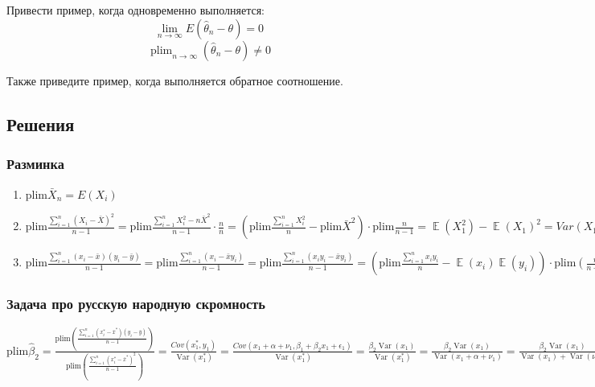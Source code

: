 \documentclass[10pt, a4paper]{extarticle}
\DeclareMathOperator{\E}{\mathbb{E}}
\DeclareMathOperator{\plim}{plim}
\DeclareMathOperator{\Var}{Var}
\begin{document}
\subsection{}

Привести пример, когда одновременно выполняется:
\[
\lim_{n \to \infty}
E(\hat \theta_{n} - \theta) = 0
\]
\[
\plim_{n \to \infty}
(\hat \theta_{n} - \theta) \neq 0
\]

Также приведите пример, когда выполняется обратное соотношение.


\subsection{Решения}

\subsubsection*{Разминка}

\begin{enumerate}
	\item $\text{plim} \bar{X}_n = E(X_i)$
	
	\item $\text{plim} \frac{\sum_{i = 1}^{n}(X_i - \bar{X})^2}{n - 1} = \text{plim} \frac{\sum_{i = 1}^nX_i^2 - n \bar{X}^2}{n - 1} \cdot \frac{n}{n} = \left( \text{plim} \frac{\sum_{i = 1}^n X_i^2 }{n} - \text{plim} \bar{X}^2 \right) \cdot \text{plim}  \frac{n}{n-1} = \E(X_1^2) - \E(X_1)^2 = Var(X_1)$
	
	\item $ \text{plim} \frac{\sum_{i = 1}^n(x_i - \bar{x})(y_i - \bar{y})}{n - 1} = \text{plim}\frac{\sum_{i = 1}^n(x_i - \bar{x}y_i)}{n - 1} = \text{plim} \frac{\sum_{i = 1}^n(x_iy_i - \bar{x}y_i)}{n - 1} = \left( \text{plim} \frac{\sum_{i = 1}^nx_iy_i}{n} - \E(x_i)\E(y_i) \right) \cdot \text{plim} \left( \frac{n}{n-1} \right) = \E(XY) - \E(X)\E(Y) = (X, Y)$
	
	
\end{enumerate}
\subsubsection*{Задача про русскую народную скромность}
$\text{plim} \hat{\beta}_2 = \frac{\text{plim} \left( \frac{\sum_{i = 1}^n(x_i^* - \bar{x}^*)(y_i - \bar{y})}{n-1} \right)}{\text{plim} \left( \frac{\sum_{i = 1}^n(x_i^* - \bar{x}^*)^2}{n-1}\right)} = \frac{Cov(x_1^*, y_1)}{\Var(x_1^*)} = \frac{{Cov}(x_1 + \alpha + \nu_1, \beta_1 + \beta_2x_1 + \epsilon_1)}{\Var(x_1^*)} = \frac{\beta_2\Var(x_1)}{\Var(x_1^*)} = \frac{\beta_2\Var(x_1)}{\Var(x_1 + \alpha + \nu_1)} = \frac{\beta_2\Var(x_1)}{\Var(x_1) + \Var(\nu_1)} = \frac{\beta_2\sigma_x^2}{\sigma_x^2 + \sigma_\nu^2}$\\
\end{document}
